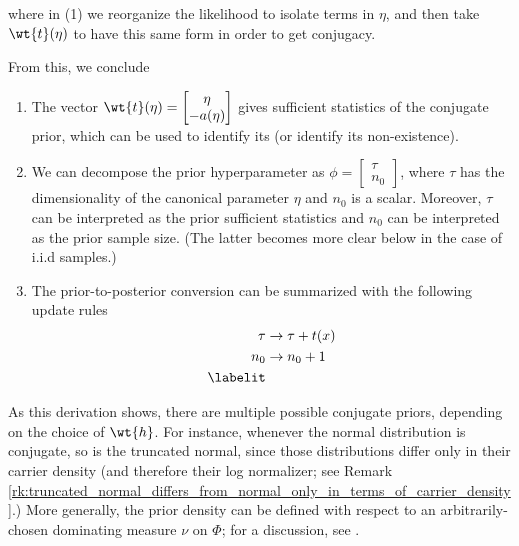 where in (1) we reorganize the likelihood to isolate terms in $\eta$, and then take $\wt{t}(\eta)$ to have this same form in order to get conjugacy.  

From this, we conclude
\begin{enumerate} 
\item The vector $\wt{t}(\eta) = \begin{bmatrix} 
\eta \\
-a(\eta)
\end{bmatrix}$ gives sufficient statistics of the conjugate prior, which can be used to identify its (or identify its non-existence).
\item We can decompose the prior hyperparameter as $\phi = \begin{bmatrix} 
\tau \\
n_0
\end{bmatrix}$,   
where $\tau$ has the dimensionality of the canonical parameter $\eta$ and $n_0$ is a scalar.  Moreover, $\tau$ can be interpreted as the prior sufficient statistics and $n_0$ can be interpreted as the prior sample size.  (The latter becomes more clear below in the case of i.i.d samples.)	
\item  The prior-to-posterior conversion can be summarized with the following update rules
\begin{align*}
\tau & \to \tau + t(x) \\
n_0 & \to  n_0 + 1 \\
\labelit \label{eqn:general_formalism_prior_to_posterior_conversion_after_single_observation}
\end{align*}
\end{enumerate}

\begin{remark}
As this derivation shows, there are multiple possible conjugate priors, depending on the choice of $\wt{h}$.   For instance, whenever the normal distribution is conjugate, so is the truncated normal, since those distributions differ only in their carrier density (and therefore their log normalizer; see Remark \ref{rk:truncated_normal_differs_from_normal_only_in_terms_of_carrier_density}.)  More generally, the prior density can be defined with respect to an arbitrarily-chosen dominating measure $\nu$ on $\Phi$; for a discussion, see  \href{https://stats.stackexchange.com/questions/176668/can-anyone-explain-conjugate-priors-in-simplest-possible-terms}{}.
\label{rk:conjugate_prior_can_have_any_desired_carrier_density}
\end{remark}


